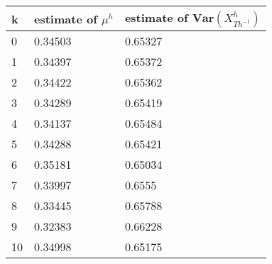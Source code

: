 \begin{tabular}{lll}
k & estimate of $\mu^h$ & estimate of $\bm{Var}(X^h_ {Th^{-1}})$ \\ 
\hline 
0 & 0.34503 & 0.65327 \\ 
1 & 0.34397 & 0.65372 \\ 
2 & 0.34422 & 0.65362 \\ 
3 & 0.34289 & 0.65419 \\ 
4 & 0.34137 & 0.65484 \\ 
5 & 0.34288 & 0.65421 \\ 
6 & 0.35181 & 0.65034 \\ 
7 & 0.33997 & 0.6555 \\ 
8 & 0.33445 & 0.65788 \\ 
9 & 0.32383 & 0.66228 \\ 
10 & 0.34998 & 0.65175 \\ 
\hline 
\end{tabular}